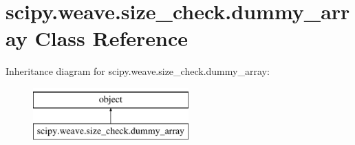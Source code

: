 \hypertarget{classscipy_1_1weave_1_1size__check_1_1dummy__array}{}\section{scipy.\+weave.\+size\+\_\+check.\+dummy\+\_\+array Class Reference}
\label{classscipy_1_1weave_1_1size__check_1_1dummy__array}
Inheritance diagram for scipy.\+weave.\+size\+\_\+check.\+dummy\+\_\+array\+:\begin{figure}[H]
\begin{center}
\leavevmode
\includegraphics[height=2.000000cm]{classscipy_1_1weave_1_1size__check_1_1dummy__array}
\end{center}
\end{figure}
